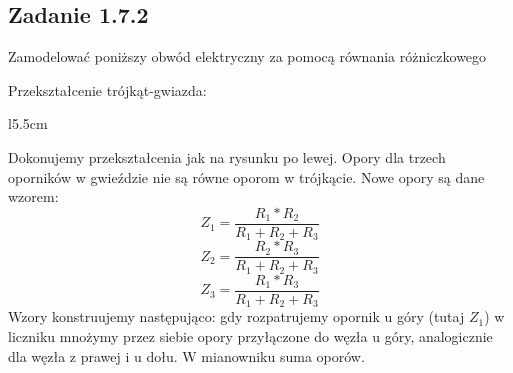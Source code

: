 \pagebreak
\subsection*{Zadanie 1.7.2}
Zamodelować poniższy obwód elektryczny za pomocą równania różniczkowego\\ 
\lineh

Przekształcenie trójkąt-gwiazda:

\begin{wrapfigure}{l}{5.5cm}
\end{wrapfigure}
Dokonujemy przekształcenia jak na rysunku po lewej. Opory dla trzech oporników w gwieździe nie są równe oporom w trójkącie. Nowe opory są dane wzorem:
\begin{equation}
Z_{1} = \frac{R_{1} * R_{2}}{R_{1} + R_{2} + R_{3}}
\end{equation}
\begin{equation}
Z_{2} = \frac{R_{2} * R_{3}}{R_{1} + R_{2} + R_{3}}
\end{equation}
\begin{equation}
Z_{3} = \frac{R_{1} * R_{3}}{R_{1} + R_{2} + R_{3}}
\end{equation}
Wzory konstruujemy następująco: gdy rozpatrujemy opornik u góry (tutaj $Z_{1}$) w liczniku mnożymy przez siebie opory przyłączone do węzła u góry, analogicznie dla węzła z prawej i u dołu. W mianowniku suma oporów.

